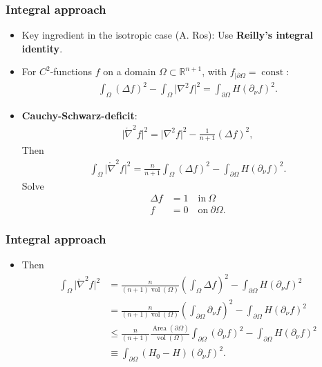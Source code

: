 \documentclass{beamer}
\newcommand{\sub}{\subset}
\newcommand{\mr}{\mathring}
\newcommand{\bbR}{\mathbb{R}}
\newcommand{\8}{\infty}
\newcommand{\Om}{\Omega}
\newcommand{\De}{\Delta}
\newcommand{\del}{\partial}
\newcommand{\n}{\nabla}
\newcommand{\fr}[2]{\frac{#1}{#2}}
\newcommand{\tfr}[2]{\tfrac{#1}{#2}}
\DeclareMathOperator{\const}{const}
\DeclareMathOperator{\vol}{vol}
\DeclareMathOperator{\Area}{Area}
\newcommand{\eq}[1]{\begin{equation}\begin{alignedat}{2} #1 \end{alignedat}\end{equation}}
\newcommand{\br}[1]{\left(#1\right)}
\newcommand{\abs}[1]{\lvert #1\rvert}
\newcommand{\q}{\quad}
\begin{document}
\begin{frame} 
\frametitle{Integral approach}

\begin{itemize}
\item[] Key ingredient in the isotropic case (A. Ros): Use {\bf{Reilly's integral identity}}.
\item[] For $C^{2}$-functions $f$ on a domain $\Om\sub\bbR^{n+1}$, with $f_{|\del\Om}=\const$:
\eq{\int_{\Om}(\De f)^{2}-\int_{\Om}\abs{\n^{2}f}^{2}=\int_{\del\Om}H(\del_{\nu}f)^{2}.}
\item[] {\bf{Cauchy-Schwarz-deficit}}:
\eq{\abs{\mr{\n}^{2}f}^{2}=\abs{\n^{2}f}^{2}-\tfr{1}{n+1}(\De f)^{2},}
Then
\eq{\int_{\Om}\abs{\mr{\n}^{2}f}^{2}=\fr{n}{n+1}\int_{\Om}(\De f)^{2}-\int_{\del\Om}H(\del_{\nu}f)^{2}.}
Solve 
\eq{\De f &= 1\q \mbox{in}~\Om\\
		f &= 0 \q \mbox{on}~\del\Om.}
\end{itemize}
\end{frame}

\begin{frame} 
\frametitle{Integral approach}
\begin{itemize}
\item[] Then 
\eq{\int_{\Om}\abs{\mr{\n}^{2}f}^{2}&=\fr{n}{(n+1)\vol(\Om)}\br{\int_{\Om}\De f}^{2}-\int_{\del\Om}H(\del_{\nu}f)^{2}\\
					&=\fr{n}{(n+1)\vol(\Om)}\br{\int_{\del\Om}\del_{\nu}f}^{2}-\int_{\del\Om}H(\del_{\nu}f)^{2}\\
					&\leq \fr{n}{(n+1)}\fr{\Area(\del\Om)}{{\vol(\Om)}}\int_{\del\Om}(\del_{\nu}f)^{2}-\int_{\del\Om}H(\del_{\nu}f)^{2}\\
					&\equiv\int_{\del\Om}(H_{0}-H)(\del_{\nu}f)^{2}.}

\end{itemize}
\end{frame}
\end{document}
